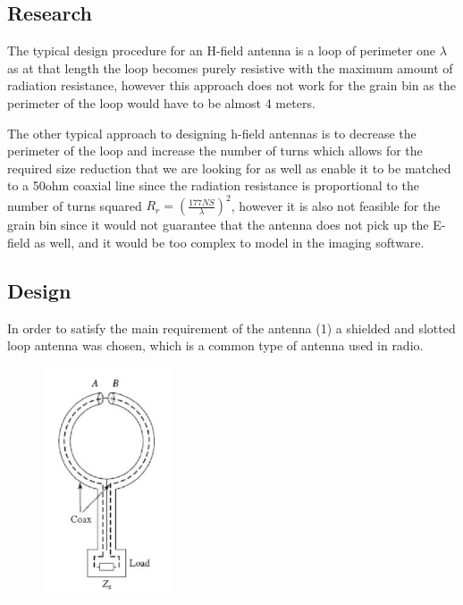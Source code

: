 \subsection{Research}

The typical design procedure for an H-field antenna is a loop of perimeter one $\lambda$ as at that length the loop becomes purely resistive with the maximum amount of radiation resistance, however this approach does not work for the grain bin as the perimeter of the loop would have to be almost 4 meters.

The other typical approach to designing h-field antennas is to decrease the perimeter of the loop and increase the number of turns which allows for the required size reduction that we are looking for as well as enable it to be matched to a 50ohm coaxial line since the radiation resistance is proportional to the number of turns squared $R_r = (\frac{177NS}{\lambda})^2$, however it is also not feasible for the grain bin since it would not guarantee that the antenna does not pick up the E-field as well, and it would be too complex to model in the imaging software.

\subsection{Design}

In order to satisfy the main requirement of the antenna (1) a shielded and slotted loop antenna was chosen, which is a common type of antenna used in radio.

\begin{figure}[h]
	\begin{center}
		\includegraphics[width=1.5in]{./images/Figure1.jpg}
		\caption{}
		\label{fig:hfield_fig1}
	\end{center}
\end{figure}

